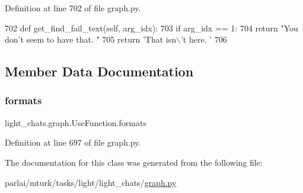 Definition at line 702 of file graph.\+py.


\begin{DoxyCode}
702     \textcolor{keyword}{def }get\_find\_fail\_text(self, arg\_idx):
703         \textcolor{keywordflow}{if} arg\_idx == 1:
704             \textcolor{keywordflow}{return} \textcolor{stringliteral}{"You don't seem to have that. "}
705         \textcolor{keywordflow}{return} \textcolor{stringliteral}{'That isn\(\backslash\)'t here. '}
706 
\end{DoxyCode}


\subsection{Member Data Documentation}
\mbox{\label{classlight__chats_1_1graph_1_1UseFunction_ab5894266d221cc0d34b1e653b4bafc2d}} 
\subsubsection{\texorpdfstring{formats}{formats}}
{\footnotesize\ttfamily light\+\_\+chats.\+graph.\+Use\+Function.\+formats}



Definition at line 697 of file graph.\+py.



The documentation for this class was generated from the following file\+:\begin{DoxyCompactItemize}
\item 
parlai/mturk/tasks/light/light\+\_\+chats/\hyperlink{parlai_2mturk_2tasks_2light_2light__chats_2graph_8py}{graph.\+py}\end{DoxyCompactItemize}
